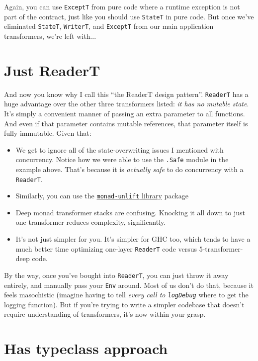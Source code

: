 Again, you can use \texttt{ExceptT} from pure code where a runtime
exception is not part of the contract, just like you should use
\texttt{StateT} in pure code. But once we've eliminated \texttt{StateT},
\texttt{WriterT}, and \texttt{ExceptT} from our main application
transformers, we're left with...

\section{Just ReaderT}

And now you know why I call this ``the ReaderT design pattern''.
\texttt{ReaderT} has a huge advantage over the other three transformers
listed: \emph{it has no mutable state}. It's simply a convenient manner
of passing an extra parameter to all functions. And even if that
parameter contains mutable references, that parameter itself is fully
immutable. Given that:

\begin{itemize}

\item
  We get to ignore all of the state-overwriting issues I mentioned with
  concurrency. Notice how we were able to use the \texttt{.Safe} module
  in the example above. That's because it is \emph{actually safe} to do
  concurrency with a \texttt{ReaderT}.
\item
  Similarly, you can use the
  \href{https://www.stackage.org/package/monad-unlift}{\texttt{monad-unlift}
  library} package
\item
  Deep monad transformer stacks are confusing. Knocking it all down to
  just one transformer reduces complexity, significantly.
\item
  It's not just simpler for you. It's simpler for GHC too, which tends
  to have a much better time optimizing one-layer \texttt{ReaderT} code
  versus 5-transformer-deep code.
\end{itemize}
By the way, once you've bought into \texttt{ReaderT}, you can just throw
it away entirely, and manually pass your \texttt{Env} around. Most of us
don't do that, because it feels masochistic (imagine having to tell
\emph{every call to \texttt{logDebug}} where to get the logging
function). But if you're trying to write a simpler codebase that doesn't
require understanding of transformers, it's now within your grasp.

\section{Has typeclass approach}

